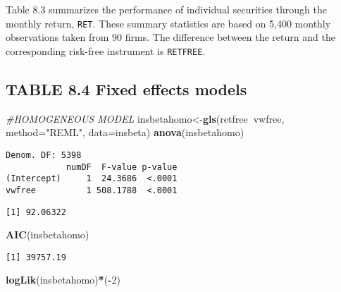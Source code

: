 \documentclass[]{book}
\newenvironment{Shaded}{\begin{snugshade}}{\end{snugshade}}
\newcommand{\CommentTok}[1]{\textcolor[rgb]{0.56,0.35,0.01}{\textit{#1}}}
\newcommand{\DataTypeTok}[1]{\textcolor[rgb]{0.13,0.29,0.53}{#1}}
\newcommand{\DecValTok}[1]{\textcolor[rgb]{0.00,0.00,0.81}{#1}}
\newcommand{\KeywordTok}[1]{\textcolor[rgb]{0.13,0.29,0.53}{\textbf{#1}}}
\newcommand{\NormalTok}[1]{#1}
\newcommand{\OperatorTok}[1]{\textcolor[rgb]{0.81,0.36,0.00}{\textbf{#1}}}
\newcommand{\StringTok}[1]{\textcolor[rgb]{0.31,0.60,0.02}{#1}}
\begin{document}
Table 8.3 summarizes the performance of individual securities through the monthly return, \texttt{RET}. These summary statistics are based on 5,400 monthly observations taken from 90 firms. The difference between the return and the corresponding risk-free instrument is \texttt{RETFREE}.

\hypertarget{table-8.4-fixed-effects-models}{%
\subsection{TABLE 8.4 Fixed effects models}\label{table-8.4-fixed-effects-models}}

\begin{Shaded}
\begin{Highlighting}[]
\CommentTok{#HOMOGENEOUS MODEL}
\NormalTok{insbetahomo<-}\KeywordTok{gls}\NormalTok{(retfree}\OperatorTok{~}\NormalTok{vwfree, }\DataTypeTok{method=}\StringTok{"REML"}\NormalTok{, }\DataTypeTok{data=}\NormalTok{insbeta) }
\KeywordTok{anova}\NormalTok{(insbetahomo)}
\end{Highlighting}
\end{Shaded}

\begin{verbatim}
Denom. DF: 5398 
            numDF  F-value p-value
(Intercept)     1  24.3686  <.0001
vwfree          1 508.1788  <.0001
\end{verbatim}

\begin{Shaded}
\end{Shaded}

\begin{verbatim}
[1] 92.06322
\end{verbatim}

\begin{Shaded}
\begin{Highlighting}[]
\KeywordTok{AIC}\NormalTok{(insbetahomo)}
\end{Highlighting}
\end{Shaded}

\begin{verbatim}
[1] 39757.19
\end{verbatim}

\begin{Shaded}
\begin{Highlighting}[]
\KeywordTok{logLik}\NormalTok{(insbetahomo)}\OperatorTok{*}\NormalTok{(}\OperatorTok{-}\DecValTok{2}\NormalTok{)}
\end{Highlighting}
\end{Shaded}
\end{document}
